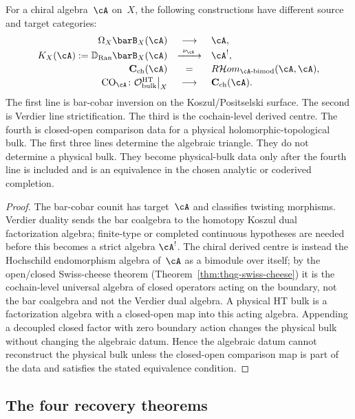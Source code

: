 \begin{proposition}
\label{prop:thqg-intro-four-layer-separation}
For a chiral algebra~$\cA$ on~$X$, the following constructions have
different source and target categories:
\[
\begin{array}{rcl}
\Omega_X\barB_X(\cA) &\longrightarrow& \cA,\\[2pt]
K_X(\cA):=\mathbb{D}_{\operatorname{Ran}}\barB_X(\cA)
&\xrightarrow{\ \nu_{\cA}\ }&\cA^!,\\[2pt]
\mathbf{C}_{\mathrm{ch}}(\cA) &=&
R\mathcal{H}om_{\cA\text{-bimod}}(\cA,\cA),\\[2pt]
\mathrm{CO}_\cA\colon
\mathcal{O}^{\mathrm{HT}}_{\mathrm{bulk}}\big|_X
&\longrightarrow&
\mathbf{C}_{\mathrm{ch}}(\cA).
\end{array}
\]
The first line is bar-cobar inversion on the Koszul/Positselski
surface. The second is Verdier line strictification. The third is the
cochain-level derived centre. The fourth is closed-open comparison
data for a physical holomorphic-topological bulk. The first three
lines determine the algebraic triangle. They do not determine a
physical bulk. They become physical-bulk data only after the fourth
line is included and is an equivalence in the chosen analytic or
coderived completion.
\end{proposition}

\begin{proof}
The bar-cobar counit has target~$\cA$ and classifies twisting
morphisms. Verdier duality sends the bar coalgebra to the homotopy
Koszul dual factorization algebra; finite-type or completed
continuous hypotheses are needed before this becomes a strict algebra
$\cA^!$. The chiral derived centre is instead the Hochschild
endomorphism algebra of~$\cA$ as a bimodule over itself; by the
open/closed Swiss-cheese theorem
(Theorem~\ref{thm:thqg-swiss-cheese}) it is the cochain-level
universal algebra of closed operators acting on the boundary, not the
bar coalgebra and not the Verdier dual algebra. A physical HT bulk is
a factorization algebra with a closed-open map into this acting
algebra.
Appending a decoupled closed factor with zero boundary action changes
the physical bulk without changing the algebraic datum. Hence the
algebraic datum cannot reconstruct the physical bulk unless the
closed-open comparison map is part of the data and satisfies the
stated equivalence condition.
\end{proof}

\subsection{The four recovery theorems}
\label{subsec:thqg-intro-four-recovery}

